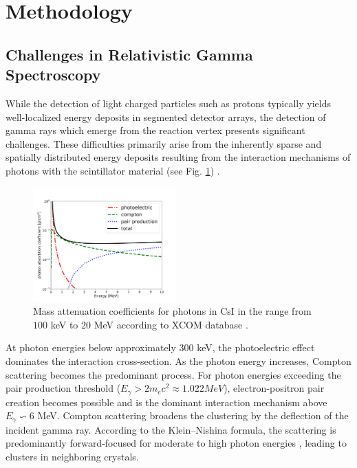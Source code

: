 \documentclass[final,5p,times,twocolumn]{elsarticle}
\begin{document}
\section{Methodology}
\label{sec:metho}
\subsection{Challenges in Relativistic Gamma Spectroscopy}\label{s_sec:gamma_spec}
While the detection of light charged particles such as protons typically yields well-localized energy deposits in segmented detector arrays, the detection of gamma rays which emerge from the reaction vertex presents significant challenges. These difficulties primarily arise from the inherently sparse and spatially distributed energy deposits resulting from the interaction mechanisms of photons with the scintillator material (see Fig. \ref{fig:csi}) \cite{kolanoski2016teilchendetektoren}.\newline
\begin{figure}[!htb]
	\centering 
	\includegraphics[width=0.49\textwidth]{csi_attuenuation.png}	
	\caption{Mass attenuation coefficients for photons in CsI in the range from $100$ keV to $20$ MeV according to XCOM database \cite{seltzer2010xcom}.} 
	\label{fig:csi}%
\end{figure}
At photon energies below approximately $300$ keV, the photoelectric effect dominates the interaction cross-section. As the photon energy increases, Compton scattering becomes the predominant process. For photon energies exceeding the pair production threshold ($E_{\gamma} > 2m_{e}c^2 \approx 1.022 MeV$), electron-positron pair creation becomes possible and is the dominant interaction mechanism above $E_{\gamma} \backsim 6$ MeV.\newline
Compton scattering broadens the clustering by the deflection of the incident gamma ray. According to the Klein–Nishina formula, the scattering is predominantly forward-focused for moderate to high photon energies \cite{klein1929streuung}, leading to clusters in neighboring crystals.\newline
\end{document}

